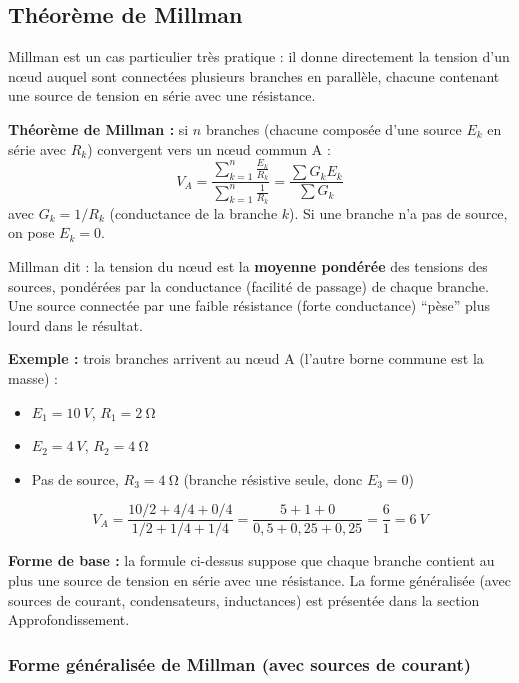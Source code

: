 \documentclass[12pt,a4paper,twoside]{book}
\begin{document}
\subsection{Théorème de Millman}

Millman est un cas particulier très pratique : il donne directement la tension d'un n\oe ud auquel sont connectées plusieurs branches en parallèle, chacune contenant une source de tension en série avec une résistance.

\begin{formule}
\textbf{Théorème de Millman :} si $n$ branches (chacune composée d'une source $E_k$ en série avec $R_k$) convergent vers un n\oe ud commun A :
\[
\boxed{V_A = \frac{\displaystyle\sum_{k=1}^{n} \frac{E_k}{R_k}}{\displaystyle\sum_{k=1}^{n} \frac{1}{R_k}} = \frac{\sum G_k E_k}{\sum G_k}}
\]
avec $G_k = 1/R_k$ (conductance de la branche $k$). Si une branche n'a pas de source, on pose $E_k = 0$.
\end{formule}

\begin{intuition}
Millman dit : la tension du n\oe ud est la \textbf{moyenne pondérée} des tensions des sources, pondérées par la conductance (facilité de passage) de chaque branche. Une source connectée par une faible résistance (forte conductance) ``pèse'' plus lourd dans le résultat.
\end{intuition}

\textbf{Exemple :} trois branches arrivent au n\oe ud A (l'autre borne commune est la masse) :
\begin{itemize}[nosep]
\item $E_1 = \SI{10}{V}$, $R_1 = \SI{2}{\ohm}$
\item $E_2 = \SI{4}{V}$, $R_2 = \SI{4}{\ohm}$
\item Pas de source, $R_3 = \SI{4}{\ohm}$ (branche résistive seule, donc $E_3 = 0$)
\end{itemize}

\[
V_A = \frac{10/2 + 4/4 + 0/4}{1/2 + 1/4 + 1/4} = \frac{5 + 1 + 0}{0{,}5 + 0{,}25 + 0{,}25} = \frac{6}{1} = \SI{6}{V}
\]

\begin{attention}
\textbf{Forme de base :} la formule ci-dessus suppose que chaque branche contient au plus une source de tension en série avec une résistance. La forme généralisée (avec sources de courant, condensateurs, inductances) est présentée dans la section Approfondissement.
\end{attention}

\subsubsection*{Forme généralisée de Millman (avec sources de courant)}
\end{document}
